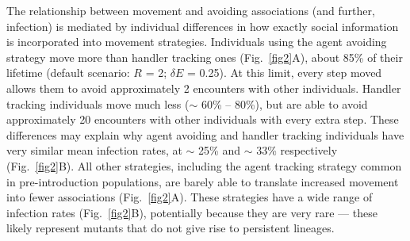 The relationship between movement and avoiding associations (and further, infection) is mediated by individual differences in how exactly social information is incorporated into movement strategies.
Individuals using the agent avoiding strategy move more than handler tracking ones (Fig.~\ref{fig2}A), about 85\% of their lifetime (default scenario: $R$ = 2; $\delta E$ = 0.25).
At this limit, every step moved allows them to avoid approximately 2 encounters with other individuals.
Handler tracking individuals move much less ($\sim$ 60\% -- 80\%), but are able to avoid approximately 20 encounters with other individuals with every extra step.
These differences may explain why agent avoiding and handler tracking individuals have very similar mean infection rates, at $\sim$ 25\% and $\sim$ 33\% respectively (Fig.~\ref{fig2}B).
All other strategies, including the agent tracking strategy common in pre-introduction populations, are barely able to translate increased movement into fewer associations (Fig.~\ref{fig2}A).
These strategies have a wide range of infection rates (Fig.~\ref{fig2}B), potentially because they are very rare --- these likely represent mutants that do not give rise to persistent lineages.

